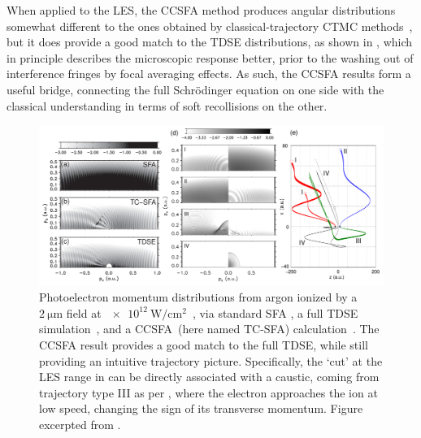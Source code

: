 When applied to the LES, the CCSFA method produces angular distributions somewhat different to the ones obtained by classical-trajectory CTMC methods~\cite{ yan_TCSFA_caustics}, but it does provide a good match to the TDSE distributions, as shown in , which in principle describes the microscopic response better, prior to the washing out of interference fringes by focal averaging effects. As such, the CCSFA results form a useful bridge, connecting the full Schrödinger equation on one side with the classical understanding in terms of soft recollisions on the other.




\begin{figure}[htb]
  \centering
  \subfloat{\label{f6-yan-original-figure-a}}
  \subfloat{\label{f6-yan-original-figure-b}}
  \subfloat{\label{f6-yan-original-figure-c}}
  \subfloat{\label{f6-yan-original-figure-d}}
  \subfloat{\label{f6-yan-original-figure-e}}
  \includegraphics[width=\textwidth]{6-LES/Figures/figure6L.png}
  \caption[
  CCSFA analysis of the Low-Energy Structures, as performed by T.-M. Yan~et~al.
  ]{
  Photoelectron momentum distributions from argon ionized by a $\SI{2}{\micro\meter}$ field at $\SI{e12}{\watt/\centi\meter^2}$~\cite{ yan_TCSFA_caustics}, via standard SFA \protect{}, a full TDSE simulation~\protect{}, and a CCSFA~(here named TC-SFA) calculation~\protect{}. The CCSFA result provides a good match to the full TDSE, while still providing an intuitive trajectory picture. Specifically, the `cut' at the LES range in \protect{} can be directly associated with a caustic, coming from trajectory type III as per \protect{}, where the electron approaches the ion at low speed, changing the sign of its transverse momentum.
  Figure excerpted from .
  }
\label{f6-yan-original-figure}
\end{figure}





